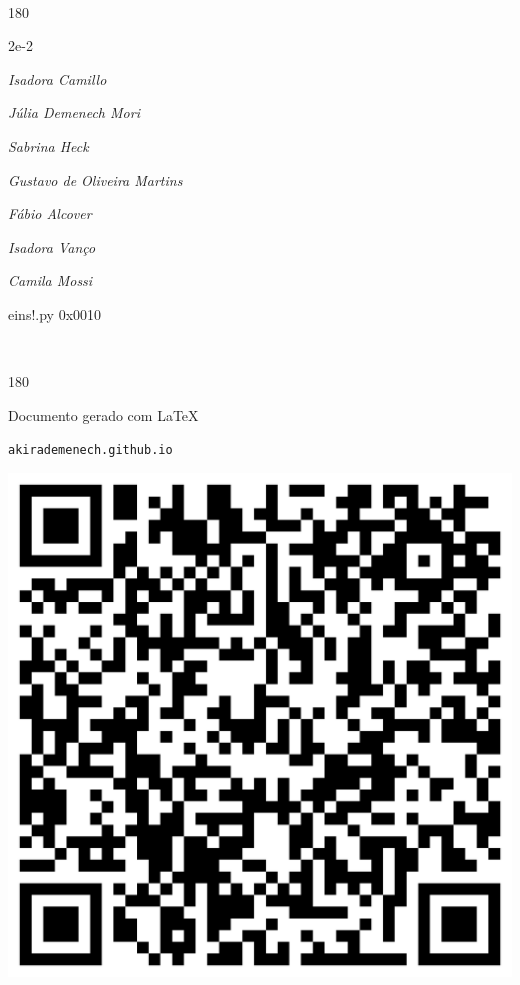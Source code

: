 \documentclass[12pt]{article}
\begin{document}
\pagebreak			

	\ 
	\vfill
	\begin{turn}{180}	
		\begin{minipage}{\textwidth}
		  	\ttfamily %
			\centering
			{\Huge 2e-2}
		  
			\hfill
		  
			

\textit{\small Isadora Camillo}

\textit{\small Júlia Demenech Mori}

\textit{\small Sabrina Heck}

\textit{\small Gustavo de Oliveira Martins}

\textit{\small Fábio Alcover}

\textit{\small Isadora Vanço}

\textit{\small Camila Mossi}

\bigskip

eins!.py
0x0010


		\end{minipage}	
	\end{turn}
	\vfill
	\

\pagebreak

	\begin{turn}{180}	
		\begin{minipage}{\textwidth}		  
		  Documento gerado com \LaTeX			
		  
		  \texttt{akirademenech.github.io}

		  \includegraphics[height=0.3\textheight]{2e-2.pdf}

		\end{minipage}	
	\end{turn}  
		  
\end{document}

